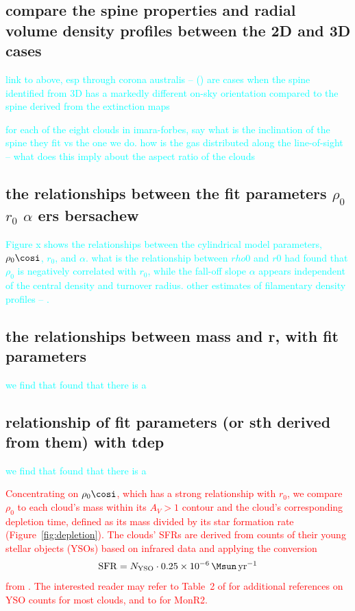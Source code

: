 \documentclass[twocolumn]{aastex631}
\begin{document}
{\subsection{compare the spine properties and radial volume density profiles between the 2D and 3D cases}
\textcolor{cyan}{link to above, esp through corona australis -- () are cases when the spine identified from 3D has a markedly different on-sky orientation compared to the spine derived from the extinction maps}

\textcolor{cyan}{for each of the eight clouds in imara-forbes, say what is the inclination of the spine they fit vs the one we do. how is the gas distributed along the line-of-sight -- what does this imply about the aspect ratio of the clouds}

\subsection{the relationships between the fit parameters $\rho_0$ $r_0$ $\alpha$ ers bersachew}

\textcolor{cyan}{Figure x shows the relationships between the cylindrical model parameters,
$\rho_0\cosi$, $r_0$, and $\alpha$. what is the relationship between $rho0$ and $r0$
\citet{ImaraForbes} had found that $\rho_0$ is negatively correlated with $r_0$, while the fall-off slope $\alpha$ appears independent of the central density and turnover radius.
other estimates of filamentary density profiles -- \citep[e.g.,][]{Arzoumanian2011, Palmeirim2013, Toci2015, Zucker2018,
Arzoumanian2019}.}

\subsection{the relationships between mass and r, with fit parameters}
\textcolor{cyan}{we find that}
\textcolor{cyan}{\cite{ImaraForbes_2023} found that there is a }


\subsection{relationship of fit parameters (or sth derived from them) with tdep}
\textcolor{cyan}{we find that}
\textcolor{cyan}{\citet{ImaraForbes_2023} found that there is a }

\textcolor{red}{Concentrating on $\rho_0\cosi$, which has a strong relationship with $r_0$, we
compare $\rho_0$ to each cloud's mass within its $A_V > 1$ contour and the cloud's
corresponding depletion time, defined as its mass divided by its star formation
rate (Figure~\ref{fig:depletion}). The clouds' SFRs are derived from counts of
their young stellar objects (YSOs) based on infrared data
\citep[e.g.,][]{Hillenbrand1997, Lada2009} and applying the conversion
\begin{align}\label{eq:sfr}
\mathrm{SFR} = N_{\mathrm{YSO}} \cdot 0.25 \times 10^{-6}\, \Msun\,\mathrm{yr}^{-1}
\end{align}
from \citet{Lada2010}. The interested reader may refer to Table~2 of
\citet{Lada2010} for additional references on YSO counts for most clouds, and to
\citet{Gutermuth2011} for MonR2.}

}
\end{document}
